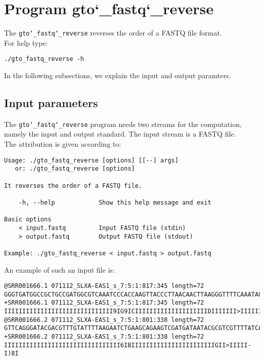 \section{Program gto\char`_fastq\char`_reverse}
The \texttt{gto\char`_fastq\char`_reverse} reverses the order of a FASTQ file format.\\
For help type:
\begin{lstlisting}
./gto_fastq_reverse -h
\end{lstlisting}
In the following subsections, we explain the input and output paramters.

\subsection*{Input parameters}

The \texttt{gto\char`_fastq\char`_reverse} program needs two streams for the computation, namely the input and output standard. The input stream is a FASTQ file.\\
The attribution is given according to:
\begin{lstlisting}
Usage: ./gto_fastq_reverse [options] [[--] args]
   or: ./gto_fastq_reverse [options]

It reverses the order of a FASTQ file.

    -h, --help            Show this help message and exit

Basic options
    < input.fastq         Input FASTQ file (stdin)
    > output.fastq        Output FASTQ file (stdout)

Example: ./gto_fastq_reverse < input.fastq > output.fastq
\end{lstlisting}
An example of such an input file is:
\begin{lstlisting}
@SRR001666.1 071112_SLXA-EAS1_s_7:5:1:817:345 length=72
GGGTGATGGCCGCTGCCGATGGCGTCAAATCCCACCAAGTTACCCTTAACAACTTAAGGGTTTTCAAATAGA
+SRR001666.1 071112_SLXA-EAS1_s_7:5:1:817:345 length=72
IIIIIIIIIIIIIIIIIIIIIIIIIIIIII9IG9ICIIIIIIIIIIIIIIIIIIIIDIIIIIII>IIIIII/
@SRR001666.2 071112_SLXA-EAS1_s_7:5:1:801:338 length=72
GTTCAGGGATACGACGTTTGTATTTTAAGAATCTGAAGCAGAAGTCGATGATAATACGCGTCGTTTTATCAT
+SRR001666.2 071112_SLXA-EAS1_s_7:5:1:801:338 length=72
IIIIIIIIIIIIIIIIIIIIIIIIIIIIIIII6IBIIIIIIIIIIIIIIIIIIIIIIIGII>IIIII-I)8I
\end{lstlisting}

